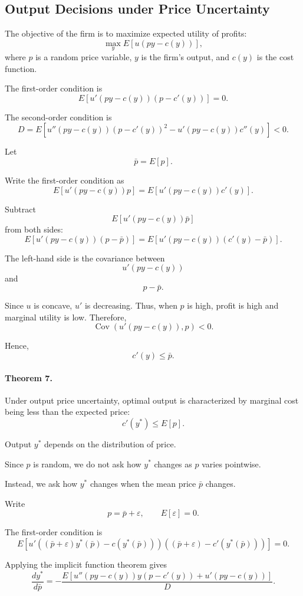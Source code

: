 \subsection{Output Decisions under Price Uncertainty}

The objective of the firm is to maximize expected utility of profits:
\[
\max_y E[u(py-c(y))],
\]
where \(p\) is a random price variable, \(y\) is the firm's output, and \(c(y)\) is the cost function.

The first-order condition is
\[
E\left[
u'(py-c(y))(p-c'(y))
\right]
=
0.
\]

The second-order condition is
\[
D
=
E\left[
u''(py-c(y))(p-c'(y))^2
-
u'(py-c(y))c''(y)
\right]
<0.
\]

Let
\[
\bar p=E[p].
\]

Write the first-order condition as
\[
E[u'(py-c(y))p]
=
E[u'(py-c(y))c'(y)].
\]

Subtract
\[
E[u'(py-c(y))\bar p]
\]
from both sides:
\[
E[u'(py-c(y))(p-\bar p)]
=
E[u'(py-c(y))(c'(y)-\bar p)].
\]

The left-hand side is the covariance between
\[
u'(py-c(y))
\]
and
\[
p-\bar p.
\]

Since \(u\) is concave, \(u'\) is decreasing. Thus, when \(p\) is high, profit is high and marginal utility is low. Therefore,
\[
\operatorname{Cov}(u'(py-c(y)),p)<0.
\]

Hence,
\[
c'(y)\le \bar p.
\]

\paragraph{Theorem 7.}

Under output price uncertainty, optimal output is characterized by marginal cost being less than the expected price:
\[
c'(y^*)\le E[p].
\]

Output \(y^*\) depends on the distribution of price.

Since \(p\) is random, we do not ask how \(y^*\) changes as \(p\) varies pointwise.

Instead, we ask how \(y^*\) changes when the mean price \(\bar p\) changes.

Write
\[
p=\bar p+\varepsilon,
\qquad
E[\varepsilon]=0.
\]

The first-order condition is
\[
E\left[
u'\left((\bar p+\varepsilon)y^*(\bar p)-c(y^*(\bar p))\right)
\left((\bar p+\varepsilon)-c'(y^*(\bar p))\right)
\right]
=
0.
\]

Applying the implicit function theorem gives
\[
\frac{dy^*}{d\bar p}
=
-
\frac{
E\left[
u''(py-c(y))y(p-c'(y))
+
u'(py-c(y))
\right]
}{
D
}.
\]

